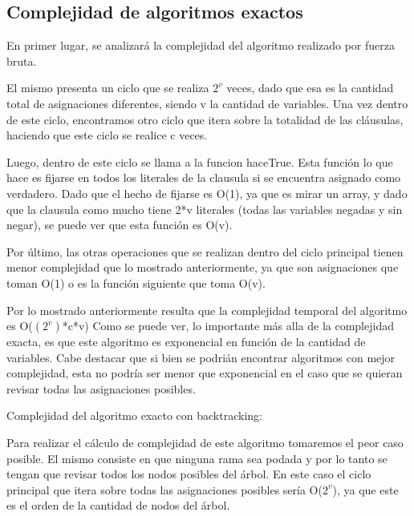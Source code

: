\documentclass[a4paper,10pt]{article}
\begin{document}
\subsection*{Complejidad de algoritmos exactos}

En primer lugar, se analizar\'a la complejidad del algoritmo realizado por fuerza bruta.

El mismo presenta un ciclo que se realiza $2^{v}$ veces, dado que esa es la cantidad total de asignaciones diferentes, siendo v la cantidad de variables. Una vez dentro de este ciclo, encontramos otro ciclo que itera sobre la totalidad de las cl\'ausulas, haciendo que este ciclo se realice c veces. 

Luego, dentro de este ciclo se llama a la funcion haceTrue. Esta funci\'on lo que hace es fijarse en todos los literales de la clausula si se encuentra asignado como verdadero. Dado que el hecho de fijarse es O(1), ya que es mirar un array, y dado que la clausula como mucho tiene 2*v literales (todas las variables negadas y sin negar), se puede ver que esta funci\'on es O(v).

Por \'ultimo, las otras operaciones que se realizan dentro del ciclo principal tienen menor complejidad que lo mostrado anteriormente, ya que son asignaciones que toman O(1) o es la funci\'on siguiente que toma O(v).

Por lo mostrado anteriormente resulta que la complejidad temporal del algoritmo es O($(2^{v})$*c*v)
Como se puede ver, lo importante m\'as alla de la complejidad exacta, es que este algoritmo es exponencial en funci\'on de la cantidad de variables. Cabe destacar que si bien se podri\'an encontrar algoritmos con mejor complejidad, esta no podr\'ia ser menor que exponencial en el caso que se quieran revisar todas las asignaciones posibles.

\bigskip

Complejidad del algoritmo exacto con backtracking:

Para realizar el c\'alculo de complejidad de este algoritmo tomaremos el peor caso posible. El mismo consiste en que ninguna rama sea podada y por lo tanto se tengan que revisar todos los nodos posibles del \'arbol. En este caso el ciclo principal que itera sobre todas las asignaciones posibles ser\'ia O($2^{v}$), ya que este es el orden de la cantidad de nodos del \'arbol. 
\end{document}
